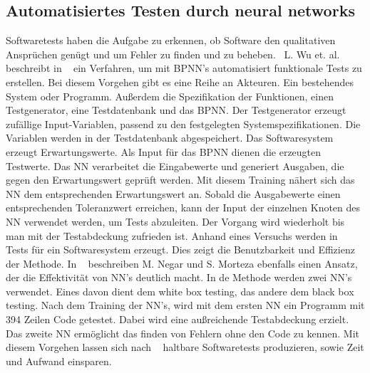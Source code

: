 \subsection{Automatisiertes Testen durch neural networks}
Softwaretests haben die Aufgabe zu erkennen, ob Software den qualitativen Ansprüchen genügt und um Fehler zu finden und zu beheben.~\cite{Wu2008}
L. Wu et. al. beschreibt in ~\cite{Wu2008} ein Verfahren, um mit BPNN's automatisiert funktionale Tests zu erstellen. 
Bei diesem Vorgehen gibt es eine Reihe an Akteuren. Ein bestehendes System oder Programm. Außerdem die Spezifikation der Funktionen, einen Testgenerator, eine Testdatenbank und das BPNN. Der Testgenerator erzeugt zufällige Input-Variablen, passend zu den festgelegten Systemspezifikationen. Die Variablen werden in der Testdatenbank abgespeichert. Das Softwaresystem erzeugt Erwartungswerte. Als Input für das BPNN dienen die erzeugten Testwerte. Das NN verarbeitet die Eingabewerte und generiert Ausgaben, die gegen den Erwartungswert geprüft werden.
Mit diesem Training nähert sich das NN dem entsprechenden Erwartungswert an.
Sobald die Ausgabewerte einen entsprechenden Toleranzwert erreichen, kann der Input der einzelnen Knoten des NN verwendet werden, um Tests abzuleiten. Der Vorgang wird wiederholt bis man mit der Testabdeckung zufrieden ist. Anhand eines Versuchs werden in~\cite{Wu2008} Tests für ein Softwaresystem erzeugt. Dies zeigt die Benutzbarkeit und Effizienz der Methode.
\noindent In ~\cite{Majma2014} beschreiben M. Negar und S. Morteza ebenfalls einen Ansatz, der die Effektivität von NN's deutlich macht. In de Methode werden zwei NN's verwendet. Eines davon dient dem white box testing, das andere dem black box testing. Nach dem Training der NN's, wird mit dem ersten NN ein Programm mit 394 Zeilen Code getestet. Dabei wird eine außreichende Testabdeckung erzielt. Das zweite NN ermöglicht das finden von Fehlern ohne den Code zu kennen. Mit diesem Vorgehen lassen sich nach ~\cite{Majma2014} haltbare Softwaretests produzieren, sowie Zeit und Aufwand einsparen.

